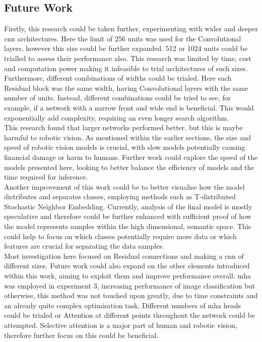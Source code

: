 \documentclass[11pt]{article}
\begin{document}
\subsection{Future Work}
Firstly, this research could be taken further, experimenting with wider and deeper \acrshort{cnn} architectures. Here the limit of 256 units was used for the Convolutional layers, however this size could be further expanded. 512 or 1024 units could be trialled to assess their performance also. This research was limited by time, cost and computation power making it infeasible to trial architectures of such sizes.\\ Furthermore, different combinations of widths could be trialed. Here each Residual block was the same width, having Convolutional layers with the same number of units. Instead, different combinations could be tried to see, for example, if a network with a narrow front and wide end is beneficial. This would exponentially add complexity, requiring an even longer search algorithm.\\
This research found that larger networks performed better, but this is maybe harmful to robotic vision. As mentioned within the earlier sections, the size and speed of robotic vision models is crucial, with slow models potentially causing financial damage or harm to humans. Further work could explore the speed of the models presented here, looking to better balance the efficiency of models and the time required for inference.\\
Another improvement of this work could be to better visualise how the model distributes and separates classes, employing methods such as T-distributed Stochastic Neighbor Embedding. Currently, analysis of the final model is mostly speculative and therefore could be further enhanced with sufficient proof of how the model represents samples within the high dimensional, semantic space. This could help to focus on which classes potentially require more data or which features are crucial for separating the data samples.\\
Most investigation here focused on Residual connections and making a \acrshort{cnn} of different sizes. Future work could also expand on the other elements introduced within this work, aiming to exploit them and improve performance overall. \acrfull{mha} was employed in experiment 3, increasing performance of image classification but otherwise, this method was not touched upon greatly, due to time constraints and an already quite complex optimisation task. Different numbers of \acrshort{mha} heads could be trialed or Attention at different points throughout the network could be attempted. Selective attention is a major part of human and robotic vision, therefore further focus on this could be beneficial.\\
\end{document}
